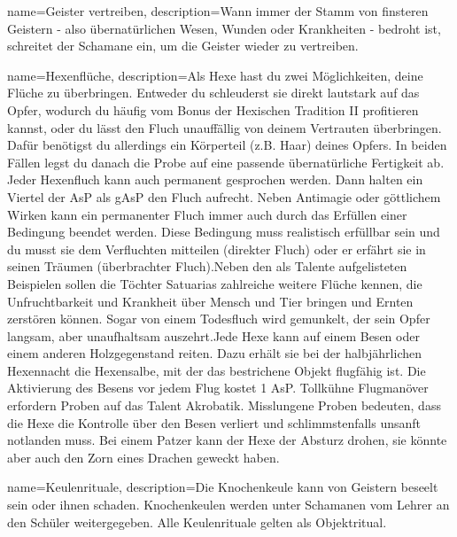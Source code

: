 {
    name={Geister vertreiben},
    description={Wann immer der Stamm von finsteren Geistern - also übernatürlichen Wesen, Wunden oder Krankheiten - bedroht ist, schreitet der Schamane ein, um die Geister wieder zu vertreiben.}
}


{
    name={Hexenflüche},
    description={Als Hexe hast du zwei Möglichkeiten, deine Flüche zu überbringen. Entweder du schleuderst sie direkt lautstark auf das Opfer, wodurch du häufig vom Bonus der Hexischen Tradition II profitieren kannst, oder du lässt den Fluch unauffällig von deinem Vertrauten überbringen. Dafür benötigst du allerdings ein Körperteil (z.B. Haar) deines Opfers. In beiden Fällen legst du danach die Probe auf eine passende übernatürliche Fertigkeit ab. Jeder Hexenfluch kann auch permanent gesprochen werden. Dann halten ein Viertel der AsP als gAsP den Fluch aufrecht. Neben Antimagie oder göttlichem Wirken kann ein permanenter Fluch immer auch durch das Erfüllen einer Bedingung beendet werden. Diese Bedingung muss realistisch erfüllbar sein und du musst sie dem Verfluchten mitteilen (direkter Fluch) oder er erfährt sie in seinen Träumen (überbrachter Fluch).\newline   Neben den als Talente aufgelisteten Beispielen sollen die Töchter Satuarias zahlreiche weitere Flüche kennen, die Unfruchtbarkeit und Krankheit über Mensch und Tier bringen und Ernten zerstören können. Sogar von einem Todesfluch wird gemunkelt, der sein Opfer langsam, aber unaufhaltsam auszehrt.\newline   Jede Hexe kann auf einem Besen oder einem anderen Holzgegenstand reiten. Dazu erhält sie bei der halbjährlichen Hexennacht die Hexensalbe, mit der das bestrichene Objekt flugfähig ist. Die Aktivierung des Besens vor jedem Flug kostet 1 AsP. Tollkühne Flugmanöver erfordern Proben auf das Talent Akrobatik. Misslungene Proben bedeuten, dass die Hexe die Kontrolle über den Besen verliert und schlimmstenfalls unsanft notlanden muss. Bei einem Patzer kann der Hexe der Absturz drohen, sie könnte aber auch den Zorn eines Drachen geweckt haben.}
}


{
    name={Keulenrituale},
    description={Die Knochenkeule kann von Geistern beseelt sein oder ihnen schaden. Knochenkeulen werden unter Schamanen vom Lehrer an den Schüler weitergegeben. Alle Keulenrituale gelten als Objektritual.}
}


